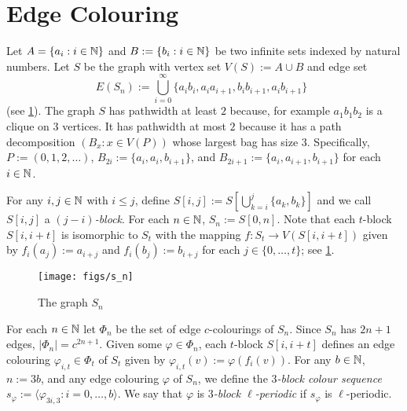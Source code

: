 \documentclass{patmorin}
\begin{document}
%
%
%








\section{Edge Colouring}
\label{edge_colourings}

Let $A=\{a_i:i\in\mathbb{N}\}$ and $B:=\{b_i:i\in\mathbb{N}\}$ be two infinite sets indexed by natural numbers.  Let $S$ be the graph with vertex set $V(S):=A\cup B$  and edge set
\[
    E(S_n) := \bigcup_{i=0}^{\infty} \{a_ib_i,a_ia_{i+1},b_ib_{i+1},a_ib_{i+1}\} \enspace
\]
(see \cref{s_n}).  The graph $S$ has pathwidth at least $2$ because, for example $a_1b_1b_2$ is a clique on $3$ vertices.  It has pathwidth at most $2$ because it has a path decomposition $(B_x:x\in V(P))$ whose largest bag has size $3$.  Specifically, $P:=(0,1,2,\ldots)$, $B_{2i}:=\{a_{i},a_i,b_{i+1}\}$, and $B_{2i+1}:=\{a_{i},a_{i+1},b_{i+1}\}$ for each $i\in\mathbb{N}$.

For any $i,j\in\mathbb{N}$ with $i\le j$, define $S[i,j]:=S[\bigcup_{k=i}^j\{a_k,b_k\}]$ and we call $S[i,j]$ a \emph{$(j-i)$-block}.  For each $n\in\mathbb{N}$, $S_n:=S[0,n]$.  Note that each $t$-block $S[i,i+t]$ is isomorphic to $S_t$ with the mapping $f:S_t\to V(S[i,i+t])$ given by $f_i(a_{j}):=a_{i+j}$ and $f_i(b_{j}):=b_{i+j}$ for each $j\in\{0,\ldots,t\}$; see \cref{s_n}.

\begin{figure}
    \begin{center}
    \texttt{[image: figs/s\_n]}
\end{center}
\caption{The graph $S_n$}
\label{s_n}
\end{figure}

For each $n\in\mathbb{N}$ let $\Phi_n$ be the set of edge $c$-colourings of $S_n$.  Since $S_n$ has $2n+1$ edges, $|\Phi_n|=c^{2n+1}$.
Given some $\varphi\in\Phi_n$, each $t$-block $S[i,i+t]$ defines an edge colouring $\varphi_{i,t}\in \Phi_t$ of $S_t$ given by $\varphi_{i,t}(v):=\varphi(f_i(v))$.  For any $b\in\mathbb{N}$, $n:=3b$, and any edge  colouring $\varphi$ of $S_n$, we define the \emph{$3$-block colour sequence} $s_\varphi:=\langle \varphi_{3i,3}: i=0,\ldots,b\rangle$.  We say that $\varphi$ is \emph{$3$-block $\ell$-periodic} if $s_\varphi$ is $\ell$-periodic.
\end{document}
